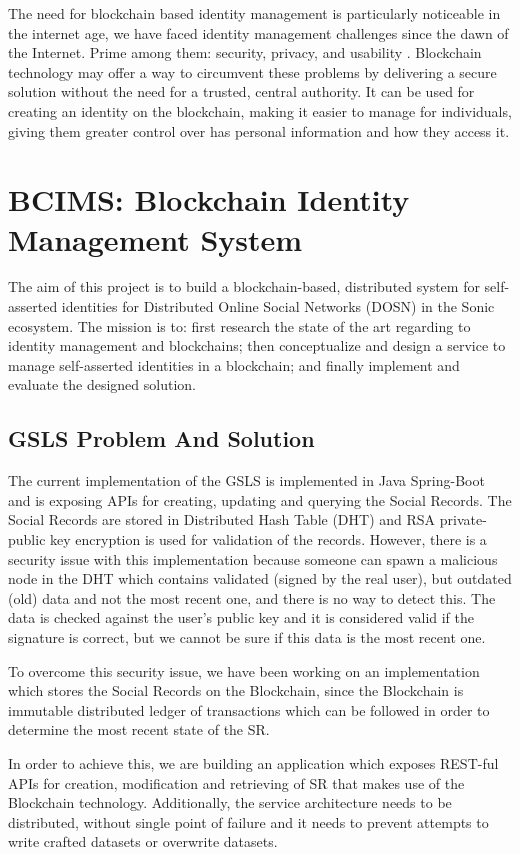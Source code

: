 The need for blockchain based identity management is particularly noticeable in the internet age, we have faced identity management challenges since the dawn of the Internet. Prime among them: security, privacy, and usability \cite{Blockchain}.
Blockchain technology may offer a way to circumvent these problems by delivering a secure solution without the need for a trusted, central authority. It can be used for creating an identity on the blockchain, making it easier to manage for individuals, giving them greater control over has personal information and how they access it.

\section{BCIMS: Blockchain Identity Management System}
The aim of this project is to build a blockchain-based, distributed system for self-asserted identities for Distributed Online Social Networks (DOSN) in the Sonic ecosystem. The mission is to:  first research the state of the art regarding to identity management and blockchains; then conceptualize and design a service to manage self-asserted identities in a blockchain; and finally implement and evaluate the designed solution.

\subsection{GSLS Problem And Solution}
The current implementation of the GSLS is implemented in Java Spring-Boot and is exposing APIs for creating, updating and  querying the Social Records. The Social Records are stored in  Distributed Hash Table (DHT) and RSA private-public key encryption is used for validation of the records. However, there is a security issue with this implementation because someone can spawn a malicious node in the DHT which contains validated (signed by the real user), but outdated (old) data and not the most recent one, and there is no way to detect this. The data is checked against the user’s public key and it is considered valid if the signature is correct, but we cannot be sure if this data is the most recent one.

To overcome this security issue, we have been working on an implementation which stores the Social Records on the Blockchain, since the Blockchain is immutable distributed ledger of transactions which can be followed in order to determine the most recent state of the SR.

In order to achieve this, we are building an application which exposes REST-ful APIs for creation, modification and retrieving of SR that makes use of the Blockchain technology. Additionally, the service architecture needs to be distributed, without single point of failure and it needs to prevent attempts to write crafted datasets or overwrite datasets.
